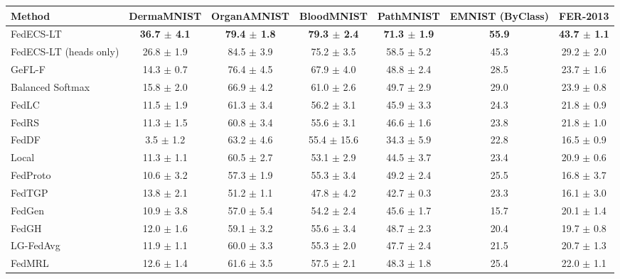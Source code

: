 \begin{tabular}{lcccccc}
\toprule
Method & DermaMNIST & OrganAMNIST & BloodMNIST & PathMNIST & EMNIST (ByClass) & FER-2013\\
\midrule
FedECS-LT & \textbf{36.7 $\pm$ 4.1} & \textbf{79.4 $\pm$ 1.8} & \textbf{79.3 $\pm$ 2.4} & \textbf{71.3 $\pm$ 1.9} & \textbf{55.9} & \textbf{43.7 $\pm$ 1.1}\\
FedECS-LT (heads only) & 26.8 $\pm$ 1.9 & 84.5 $\pm$ 3.9 & 75.2 $\pm$ 3.5 & 58.5 $\pm$ 5.2 & 45.3 & 29.2 $\pm$ 2.0\\
GeFL-F & 14.3 $\pm$ 0.7 & 76.4 $\pm$ 4.5 & 67.9 $\pm$ 4.0 & 48.8 $\pm$ 2.4 & 28.5 & 23.7 $\pm$ 1.6\\
Balanced Softmax & 15.8 $\pm$ 2.0 & 66.9 $\pm$ 4.2 & 61.0 $\pm$ 2.6 & 49.7 $\pm$ 2.9 & 29.0 & 23.9 $\pm$ 0.8\\
FedLC & 11.5 $\pm$ 1.9 & 61.3 $\pm$ 3.4 & 56.2 $\pm$ 3.1 & 45.9 $\pm$ 3.3 & 24.3 & 21.8 $\pm$ 0.9\\
FedRS & 11.3 $\pm$ 1.5 & 60.8 $\pm$ 3.4 & 55.6 $\pm$ 3.1 & 46.6 $\pm$ 1.6 & 23.8 & 21.8 $\pm$ 1.0\\
FedDF & 3.5 $\pm$ 1.2 & 63.2 $\pm$ 4.6 & 55.4 $\pm$ 15.6 & 34.3 $\pm$ 5.9 & 22.8 & 16.5 $\pm$ 0.9\\
Local & 11.3 $\pm$ 1.1 & 60.5 $\pm$ 2.7 & 53.1 $\pm$ 2.9 & 44.5 $\pm$ 3.7 & 23.4 & 20.9 $\pm$ 0.6\\
FedProto & 10.6 $\pm$ 3.2 & 57.3 $\pm$ 1.9 & 55.3 $\pm$ 3.4 & 49.2 $\pm$ 2.4 & 25.5 & 16.8 $\pm$ 3.7\\
FedTGP & 13.8 $\pm$ 2.1 & 51.2 $\pm$ 1.1 & 47.8 $\pm$ 4.2 & 42.7 $\pm$ 0.3 & 23.3 & 16.1 $\pm$ 3.0\\
FedGen & 10.9 $\pm$ 3.8 & 57.0 $\pm$ 5.4 & 54.2 $\pm$ 2.4 & 45.6 $\pm$ 1.7 & 15.7 & 20.1 $\pm$ 1.4\\
FedGH & 12.0 $\pm$ 1.6 & 59.1 $\pm$ 3.2 & 55.6 $\pm$ 3.4 & 48.7 $\pm$ 2.3 & 20.4 & 19.7 $\pm$ 0.8\\
LG-FedAvg & 11.9 $\pm$ 1.1 & 60.0 $\pm$ 3.3 & 55.3 $\pm$ 2.0 & 47.7 $\pm$ 2.4 & 21.5 & 20.7 $\pm$ 1.3\\
FedMRL & 12.6 $\pm$ 1.4 & 61.6 $\pm$ 3.5 & 57.5 $\pm$ 2.1 & 48.3 $\pm$ 1.8 & 25.4 & 22.0 $\pm$ 1.1\\
\bottomrule
\end{tabular}
